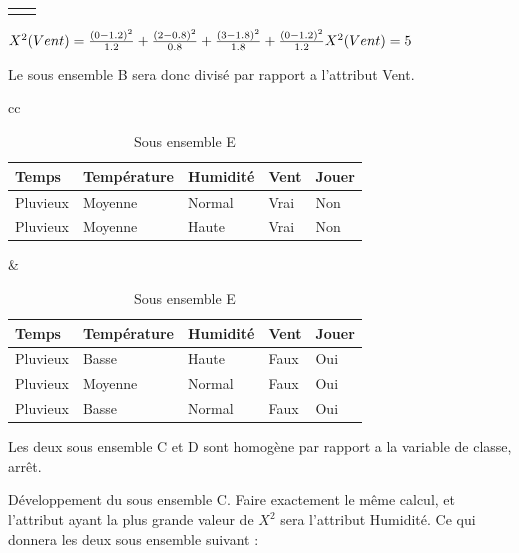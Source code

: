 \documentclass[a4paper, 11pt]{report}
\begin{document}
\begin{itemize}
\begin{enumerate}
\begin{table}[!h]
\begin{small}
\begin{tabular}{cc}
\begin{minipage}{.5\linewidth}
   \end{minipage} 
\end{tabular}
\end{small}
\end{table}

$X^2(Vent) = \frac{(0-1.2)^2}{1.2}+\frac{(2-0.8)^2}{0.8}+\frac{(3-1.8)^2}{1.8}+\frac{(0-1.2)^2}{1.2}\\
X^2(Vent) = 5$
\end{enumerate}
Le sous ensemble B sera donc divisé par rapport a l'attribut Vent.



\begin{table}[!h]
\begin{small}
\begin{tabular}{cc}

    \begin{minipage}{.5\linewidth}
   
\begin{tabular}{| l | l | l | l | l |}
\hline
Temps & Température & Humidité & Vent & Jouer \\
\hline
Pluvieux & Moyenne & Normal & Vrai &  \cellcolor{green}Non \\
\hline
Pluvieux & Moyenne & Haute & Vrai &  \cellcolor{green}Non \\
\hline
\end{tabular}
      \caption{Sous ensemble D}

    \end{minipage} &

    \begin{minipage}{.5\linewidth}
\begin{tabular}{| l | l | l | l | l |}
\hline
Temps & Température & Humidité & Vent & Jouer \\
\hline
Pluvieux & Basse & Haute & Faux & \cellcolor{yellow}Oui \\
\hline
Pluvieux & Moyenne & Normal & Faux & \cellcolor{yellow}Oui \\
\hline
Pluvieux & Basse & Normal & Faux &  \cellcolor{yellow}Oui \\
\hline
\end{tabular}

      \caption{Sous ensemble E}
 
   \end{minipage} 
\end{tabular}
\end{small}	
Les deux sous ensemble C et D sont homogène par rapport a la variable de classe, arrêt.
\end{table}
Développement du sous ensemble C. Faire exactement le même calcul, et l'attribut ayant la plus grande valeur de $X^2$ sera l'attribut Humidité. Ce qui donnera les deux sous ensemble suivant :


\end{itemize}
\end{document}
